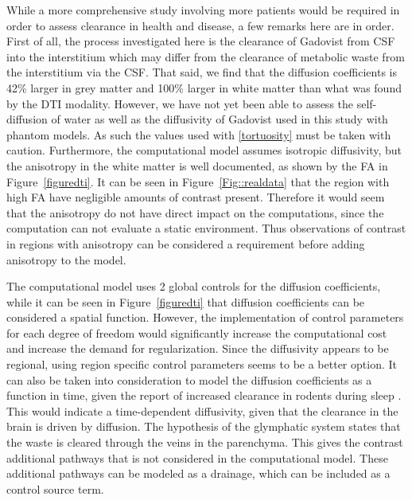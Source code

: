 \documentclass[12pt,a4paper]{article}
\begin{document}
While a more comprehensive study involving more patients would be required in order to assess clearance in health and disease, a few remarks here are in order. 
First of all, the process investigated here is the clearance of Gadovist from CSF into the interstitium which may differ from the clearance of metabolic waste 
from the interstitium via the CSF. That said, 
we find that the diffusion coefficients is 42\% larger in grey matter and 100\% larger in white matter than what was found by the DTI modality. %
However, we have not yet been able to assess the self-diffusion of water as well as the diffusivity of Gadovist used in this study with phantom models. As such 
the values used with \eqref{tortuosity} must be taken with caution. Furthermore,    
the computational model assumes isotropic diffusivity, but the anisotropy in the white matter is well documented, as shown by the FA in Figure~\ref{figuredti}. It can be seen in Figure~\ref{Fig::realdata} that the region with high FA have negligible amounts of contrast present. Therefore it would seem that the anisotropy do not have direct impact on the computations, since the computation can not evaluate a static environment. Thus observations of contrast in regions with anisotropy can be considered a requirement before adding anisotropy to the model.

The computational model uses 2 global controls for the diffusion coefficients, while it can be seen in  Figure~\ref{figuredti} that diffusion coefficients can be considered a spatial function. However, the implementation of control parameters for each degree of freedom would significantly increase the computational cost and increase the demand for regularization. Since the diffusivity appears to be regional, using region specific control parameters seems to be a better option.
It can also be taken into consideration to model the diffusion coefficients as a function in time, given the report of increased clearance in rodents during sleep \cite{xie2013sleep}. This would indicate a time-dependent diffusivity, given that the clearance in the brain is driven by diffusion. %
The hypothesis of the glymphatic system \cite{iliff2012paravascular} states that the waste is cleared through the veins in the parenchyma. This gives the contrast additional pathways that is not considered in the computational model. These additional pathways can be modeled as a drainage, which can be included as a control source term. 
\end{document}
